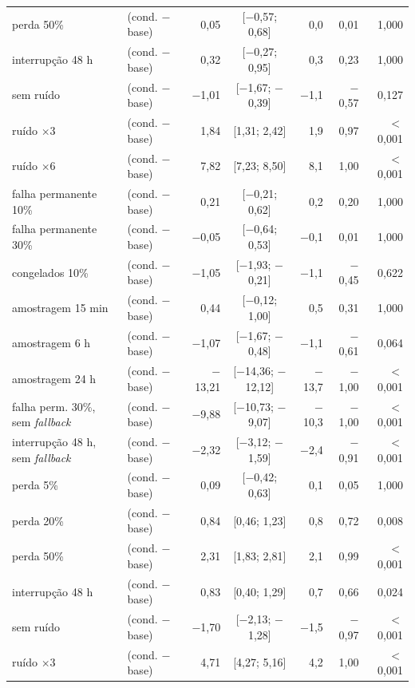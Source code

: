 \begin{tabular}{@{}llrcrrr@{}}
perda 50\% & \polC{} (cond. $-$ base) & 0,05 & [$-$0,57; 0,68] & 0,0 & 0,01 & 1,000 \\
interrupção 48 h & \polC{} (cond. $-$ base) & 0,32 & [$-$0,27; 0,95] & 0,3 & 0,23 & 1,000 \\
sem ruído & \polC{} (cond. $-$ base) & $-$1,01 & [$-$1,67; $-$0,39] & $-$1,1 & $-$0,57 & 0,127 \\
ruído $\times$3 & \polC{} (cond. $-$ base) & 1,84 & [1,31; 2,42] & 1,9 & 0,97 & $<$0,001 \\
ruído $\times$6 & \polC{} (cond. $-$ base) & 7,82 & [7,23; 8,50] & 8,1 & 1,00 & $<$0,001 \\
falha permanente 10\% & \polC{} (cond. $-$ base) & 0,21 & [$-$0,21; 0,62] & 0,2 & 0,20 & 1,000 \\
falha permanente 30\% & \polC{} (cond. $-$ base) & $-$0,05 & [$-$0,64; 0,53] & $-$0,1 & 0,01 & 1,000 \\
congelados 10\% & \polC{} (cond. $-$ base) & $-$1,05 & [$-$1,93; $-$0,21] & $-$1,1 & $-$0,45 & 0,622 \\
amostragem 15 min & \polC{} (cond. $-$ base) & 0,44 & [$-$0,12; 1,00] & 0,5 & 0,31 & 1,000 \\
amostragem 6 h & \polC{} (cond. $-$ base) & $-$1,07 & [$-$1,67; $-$0,48] & $-$1,1 & $-$0,61 & 0,064 \\
amostragem 24 h & \polC{} (cond. $-$ base) & $-$13,21 & [$-$14,36; $-$12,12] & $-$13,7 & $-$1,00 & $<$0,001 \\
falha perm. 30\%, sem \emph{fallback} & \polC{} (cond. $-$ base) & $-$9,88 & [$-$10,73; $-$9,07] & $-$10,3 & $-$1,00 & $<$0,001 \\
interrupção 48 h, sem \emph{fallback} & \polC{} (cond. $-$ base) & $-$2,32 & [$-$3,12; $-$1,59] & $-$2,4 & $-$0,91 & $<$0,001 \\
perda 5\% & \polD{} (cond. $-$ base) & 0,09 & [$-$0,42; 0,63] & 0,1 & 0,05 & 1,000 \\
perda 20\% & \polD{} (cond. $-$ base) & 0,84 & [0,46; 1,23] & 0,8 & 0,72 & 0,008 \\
perda 50\% & \polD{} (cond. $-$ base) & 2,31 & [1,83; 2,81] & 2,1 & 0,99 & $<$0,001 \\
interrupção 48 h & \polD{} (cond. $-$ base) & 0,83 & [0,40; 1,29] & 0,7 & 0,66 & 0,024 \\
sem ruído & \polD{} (cond. $-$ base) & $-$1,70 & [$-$2,13; $-$1,28] & $-$1,5 & $-$0,97 & $<$0,001 \\
ruído $\times$3 & \polD{} (cond. $-$ base) & 4,71 & [4,27; 5,16] & 4,2 & 1,00 & $<$0,001 \\

\end{tabular}
